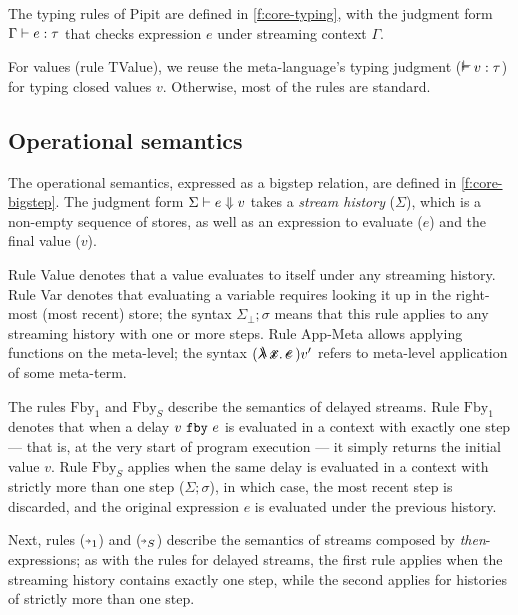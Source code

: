 \documentclass[sigplan,screen]{acmart}
\begin{document}
The typing rules of Pipit are defined in \autoref{f:core-typing}, with the judgment form $\Gamma \vdash e : \tau$ that checks expression $e$ under streaming context $\Gamma$.

For values (rule TValue), we reuse the \fstar{} meta-language's typing judgment ($\mtyping{}{v}{\tau}$) for typing closed values $v$.
Otherwise, most of the rules are standard.

\subsection{Operational semantics}
\label{ss:operational-semantics}

The operational semantics, expressed as a bigstep relation, are defined in \autoref{f:core-bigstep}.
The judgment form $\Sigma \vdash e \Downarrow v$ takes a \emph{stream history} ($\Sigma$), which is a non-empty sequence of stores, as well as an expression to evaluate ($e$) and the final value ($v$).

Rule Value denotes that a value evaluates to itself under any streaming history.
Rule Var denotes that evaluating a variable requires looking it up in the right-most (most recent) store; the syntax $\Sigma_\bot; \sigma$ means that this rule applies to any streaming history with one or more steps.
Rule App-Meta allows applying functions on the meta-level; the syntax $(\mlamX{}) v'$ refers to meta-level application of some meta-term.

The rules $\mbox{Fby}_1$ and $\mbox{Fby}_S$ describe the semantics of delayed streams.
Rule $\mbox{Fby}_1$ denotes that when a delay $v~\texttt{fby}~e$ is evaluated in a context with exactly one step --- that is, at the very start of program execution --- it simply returns the initial value $v$.
Rule $\mbox{Fby}_S$ applies when the same delay is evaluated in a context with strictly more than one step ($\Sigma; \sigma$), in which case, the most recent step is discarded, and the original expression $e$ is evaluated under the previous history.

Next, rules ($\xthenarrow_1$) and ($\xthenarrow_S$) describe the semantics of streams composed by \emph{then}-expressions; as with the rules for delayed streams, the first rule applies when the streaming history contains exactly one step, while the second applies for histories of strictly more than one step.
\end{document}
